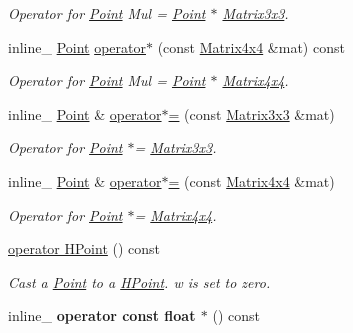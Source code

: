 \begin{DoxyCompactItemize}
\begin{DoxyCompactList}\small\item\em Operator for \hyperlink{class_point}{Point} Mul = \hyperlink{class_point}{Point} $\ast$ \hyperlink{class_matrix3x3}{Matrix3x3}. \end{DoxyCompactList}\item 
\hypertarget{class_point_a80aff349c3b01be915ef69f4490e413d}{inline\+\_\+ \hyperlink{class_point}{Point} \hyperlink{class_point_a80aff349c3b01be915ef69f4490e413d}{operator$\ast$} (const \hyperlink{class_matrix4x4}{Matrix4x4} \&mat) const }\label{class_point_a80aff349c3b01be915ef69f4490e413d}

\begin{DoxyCompactList}\small\item\em Operator for \hyperlink{class_point}{Point} Mul = \hyperlink{class_point}{Point} $\ast$ \hyperlink{class_matrix4x4}{Matrix4x4}. \end{DoxyCompactList}\item 
\hypertarget{class_point_adb2d0770621b5205b431ffaf50452971}{inline\+\_\+ \hyperlink{class_point}{Point} \& \hyperlink{class_point_adb2d0770621b5205b431ffaf50452971}{operator$\ast$=} (const \hyperlink{class_matrix3x3}{Matrix3x3} \&mat)}\label{class_point_adb2d0770621b5205b431ffaf50452971}

\begin{DoxyCompactList}\small\item\em Operator for \hyperlink{class_point}{Point} $\ast$= \hyperlink{class_matrix3x3}{Matrix3x3}. \end{DoxyCompactList}\item 
\hypertarget{class_point_a4214787c11b9c9c93f0e3ae07f15dec9}{inline\+\_\+ \hyperlink{class_point}{Point} \& \hyperlink{class_point_a4214787c11b9c9c93f0e3ae07f15dec9}{operator$\ast$=} (const \hyperlink{class_matrix4x4}{Matrix4x4} \&mat)}\label{class_point_a4214787c11b9c9c93f0e3ae07f15dec9}

\begin{DoxyCompactList}\small\item\em Operator for \hyperlink{class_point}{Point} $\ast$= \hyperlink{class_matrix4x4}{Matrix4x4}. \end{DoxyCompactList}\item 
\hypertarget{class_point_a9210b0ae57c30d2ac536491469437a1a}{\hyperlink{class_point_a9210b0ae57c30d2ac536491469437a1a}{operator H\+Point} () const }\label{class_point_a9210b0ae57c30d2ac536491469437a1a}

\begin{DoxyCompactList}\small\item\em Cast a \hyperlink{class_point}{Point} to a \hyperlink{class_h_point}{H\+Point}. w is set to zero. \end{DoxyCompactList}\item 
\hypertarget{class_point_a6a030c98542130979d09b07793e3323b}{inline\+\_\+ {\bfseries operator const float $\ast$} () const }\label{class_point_a6a030c98542130979d09b07793e3323b}


\end{DoxyCompactItemize}
